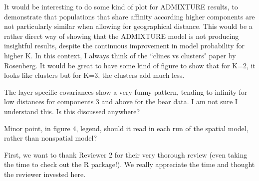 
\begin{point}{}
    It would be interesting to do some kind of plot for ADMIXTURE results, to demonstrate that populations that share affinity according higher components are not particularly similar when allowing for geographical distance. This would be a rather direct way of showing that the ADMIXTURE model is not producing insightful results, despite the continuous improvement in model probability for higher K. In this context, I always think of the ``clines vs clusters" paper by Rosenberg. It would be great to have some kind of figure to show that for K=2, it looks like clusters but for K=3, the clusters add much less.
\end{point}


\begin{point}{}
    The layer specific covariances show a very funny pattern, tending to infinity for low distances for components 3 and above for the bear data. I am not sure I understand this. Is this discussed anywhere?
\end{point}


\begin{point}{}
    Minor point, in figure 4, legend, should it read in each run of the spatial model, rather than nonspatial model?
\end{point}




First, we want to thank Reviewer 2 for their very thorough  review
(even taking the time to check out the R package!).  
We really appreciate the time and thought the reviewer invested here.

